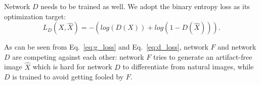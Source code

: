 \documentclass[10pt,twocolumn,letterpaper]{article}
\begin{document}
Network $D$ needs to be trained as well. We adopt the binary entropy loss as its optimization target:
\begin{equation}
L_{D}(X, \hat{X}) = -\left(log(D(X)) + log(1 - D(\hat{X}))\right).
\label{eq:d_loss}
\end{equation}

As can be seen from Eq.~\eqref{eq:g_loss} and Eq.~\eqref{eq:d_loss}, network $F$ and network $D$ are competing against each other: network $F$ tries to generate an artifact-free image $\hat{X}$ which is hard for network $D$ to differentiate from natural images, while $D$ is trained to avoid getting fooled by $F$.

\begin{table}
\begin{center}
\caption{Comparison of DCGAN and our network $D$. ``conv" is short for convolution. Each convolutional layer except the last is followed by a Batch Normalization and a Leaky ReLU, sequentially. The filter size is always $4 \times 4$. The filter numbers are shown right after ``conv".}
\vspace{-1em}
\end{center}
\end{table}
\end{document}
